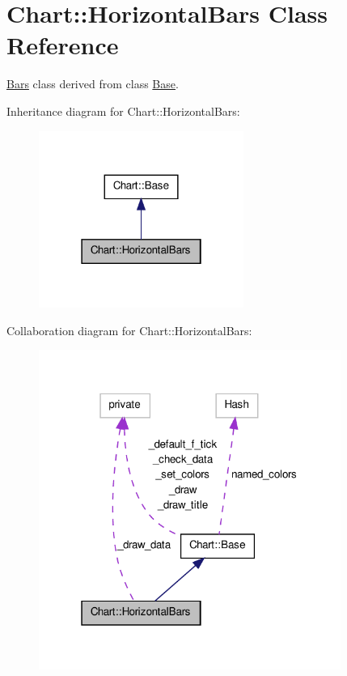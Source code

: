\hypertarget{classChart_1_1HorizontalBars}{
\section{Chart::HorizontalBars Class Reference}
\label{classChart_1_1HorizontalBars}
}


\hyperlink{classChart_1_1Bars}{Bars} class derived from class \hyperlink{classChart_1_1Base}{Base}.  




Inheritance diagram for Chart::HorizontalBars:\nopagebreak
\begin{figure}[H]
\begin{center}
\leavevmode
\includegraphics[width=190pt]{classChart_1_1HorizontalBars__inherit__graph}
\end{center}
\end{figure}


Collaboration diagram for Chart::HorizontalBars:\nopagebreak
\begin{figure}[H]
\begin{center}
\leavevmode
\includegraphics[width=280pt]{classChart_1_1HorizontalBars__coll__graph}
\end{center}
\end{figure}
